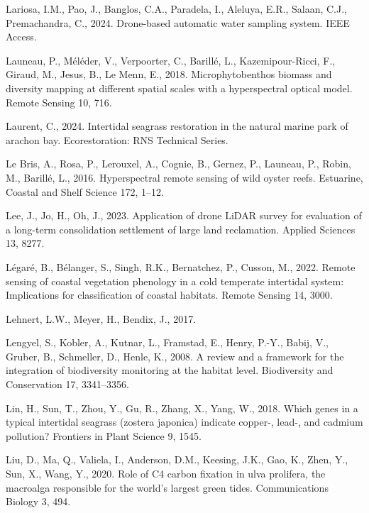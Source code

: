 \documentclass[
  letterpaper,
  11pt,
  english,
  singlespacing,
  headsepline]{MastersDoctoralThesis}
\newlength{\cslhangindent}
\newenvironment{CSLReferences}[2] %
 {\begin{list}{}{%
  \setlength{\itemindent}{0pt}
  \setlength{\leftmargin}{0pt}
  \setlength{\parsep}{0pt}
  \ifodd #1
   \setlength{\leftmargin}{\cslhangindent}
   \setlength{\itemindent}{-1\cslhangindent}
  \fi
  \setlength{\itemsep}{#2\baselineskip}}}
 {\end{list}}
\begin{document}
\begin{CSLReferences}{1}{0}
Lariosa, I.M., Pao, J., Banglos, C.A., Paradela, I., Aleluya, E.R.,
Salaan, C.J., Premachandra, C., 2024. Drone-based automatic water
sampling system. IEEE Access.

Launeau, P., Méléder, V., Verpoorter, C., Barillé, L., Kazemipour-Ricci,
F., Giraud, M., Jesus, B., Le Menn, E., 2018. Microphytobenthos biomass
and diversity mapping at different spatial scales with a hyperspectral
optical model. Remote Sensing 10, 716.

Laurent, C., 2024. Intertidal seagrass restoration in the natural marine
park of arachon bay. Ecorestoration: RNS Technical Series.

Le Bris, A., Rosa, P., Lerouxel, A., Cognie, B., Gernez, P., Launeau,
P., Robin, M., Barillé, L., 2016. Hyperspectral remote sensing of wild
oyster reefs. Estuarine, Coastal and Shelf Science 172, 1--12.

Lee, J., Jo, H., Oh, J., 2023. Application of drone LiDAR survey for
evaluation of a long-term consolidation settlement of large land
reclamation. Applied Sciences 13, 8277.

Légaré, B., Bélanger, S., Singh, R.K., Bernatchez, P., Cusson, M., 2022.
Remote sensing of coastal vegetation phenology in a cold temperate
intertidal system: Implications for classification of coastal habitats.
Remote Sensing 14, 3000.

Lehnert, L.W., Meyer, H., Bendix, J., 2017.

Lengyel, S., Kobler, A., Kutnar, L., Framstad, E., Henry, P.-Y., Babij,
V., Gruber, B., Schmeller, D., Henle, K., 2008. A review and a framework
for the integration of biodiversity monitoring at the habitat level.
Biodiversity and Conservation 17, 3341--3356.

Lin, H., Sun, T., Zhou, Y., Gu, R., Zhang, X., Yang, W., 2018. Which
genes in a typical intertidal seagrass (zostera japonica) indicate
copper-, lead-, and cadmium pollution? Frontiers in Plant Science 9,
1545.

Liu, D., Ma, Q., Valiela, I., Anderson, D.M., Keesing, J.K., Gao, K.,
Zhen, Y., Sun, X., Wang, Y., 2020. Role of C4 carbon fixation in ulva
prolifera, the macroalga responsible for the world's largest green
tides. Communications Biology 3, 494.


\end{CSLReferences}
\end{document}
